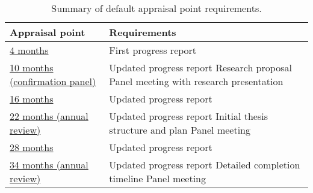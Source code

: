 \documentclass[12pt,a4paper]{article}
\begin{document}
\begin{table}[ht]
	\centering
	\begin{tabular}{p{}p{}}
	\textbf{Appraisal point} & \textbf{Requirements} \\
	\hline 
	\hyperref[sec:4months]{4 months} &	First progress report\\
	\hline
	\hyperref[sec:10months]{10 months \newline(confirmation panel)} &	Updated progress report \newline Research proposal \newline Panel meeting with research presentation \\ 
	\hline
	\hyperref[sec:16months]{16 months} & Updated progress report \\ 
	\hline
	\hyperref[sec:22months]{22 months \newline(annual review)} & Updated progress report \newline Initial thesis structure and plan \newline Panel meeting \\ 
	\hline
	\hyperref[sec:28months]{28 months} & Updated progress report \\ \hline
	\hyperref[sec:34months]{34 months \newline(annual review)} & Updated progress report \newline Detailed completion timeline \newline Panel meeting \\ 
	\end{tabular}
\caption{Summary of default appraisal point requirements.}
\label{table:points}
\end{table}
\end{document}
